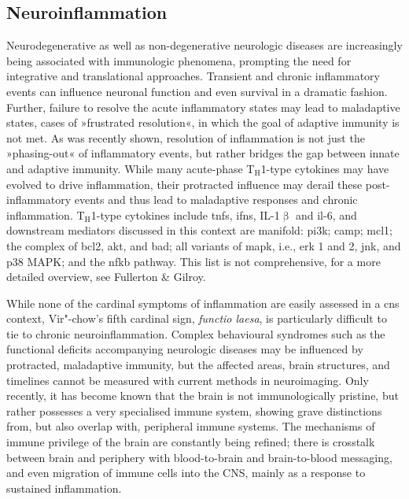 \subsection{Neuroinflammation} \label{sec:intro:neuroinflammation}
Neurodegenerative as well as non-degenerative neurologic diseases are increasingly being associated with immunologic phenomena, prompting the need for integrative and translational approaches.\cite{Lurie2018} Transient and chronic inflammatory events can influence neuronal function and even survival in a dramatic fashion. Further, failure to resolve the acute inflammatory states may lead to maladaptive states, cases of »frustrated resolution«,\cite{Fullerton2016} in which the goal of adaptive immunity is not met. As was recently shown,\cite{Newson2014} resolution of inflammation is not just the »phasing-out« of inflammatory events, but rather bridges the gap between innate and adaptive immunity. While many acute-phase T$_\mathrm{H}$1-type cytokines may have evolved to drive inflammation, their protracted influence may derail these post-inflammatory events and thus lead to maladaptive responses and chronic inflammation. T$_\mathrm{H}$1-type cytokines include \acp{tnf}, \acp{ifn}, IL-1$\upbeta$ and \ac{il}-6, and downstream mediators discussed in this context are manifold: \ac{pi3k}; \ac{camp}; \ac{mcl1}; the complex of \ac{bcl2}, \ac{akt}, and \ac{bad}; all variants of \ac{mapk}, i.e., \ac{erk} 1 and 2, \ac{jnk}, and p38 MAPK; and the \ac{nfkb} pathway. This list is not comprehensive, for a more detailed overview, see Fullerton \& Gilroy.\cite{Fullerton2016}

While none of the cardinal symptoms of inflammation are easily assessed in a \ac{cns} context, Vir"-chow's fifth cardinal sign, \emph{functio laesa}, is particularly difficult to tie to chronic neuroinflammation. Complex behavioural syndromes such as the functional deficits accompanying neurologic diseases may be influenced by protracted, maladaptive immunity, but the affected areas, brain structures, and timelines cannot be measured with current methods in neuroimaging. Only recently, it has become known that the brain is not immunologically pristine, but rather possesses a very specialised immune system, showing grave distinctions from, but also overlap with, peripheral immune systems.\cite{Louveau2015, Negi2018} The mechanisms of immune privilege of the brain are constantly being refined; there is crosstalk between brain and periphery with blood-to-brain and brain-to-blood messaging,\cite{Dantzer2018} and even migration of immune cells into the CNS, mainly as a response to sustained inflammation.

